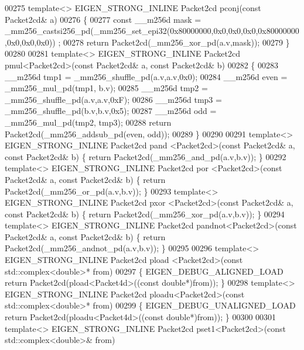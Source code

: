 \begin{DoxyCode}
00275 \textcolor{keyword}{template}<> EIGEN\_STRONG\_INLINE Packet2cd pconj(\textcolor{keyword}{const} Packet2cd& a)
00276 \{
00277   \textcolor{keyword}{const} \_\_m256d mask = \_mm256\_castsi256\_pd(\_mm256\_set\_epi32(0x80000000,0x0,0x0,0x0,0x80000000,0x0,0x0,0x0))
      ;
00278   \textcolor{keywordflow}{return} Packet2cd(\_mm256\_xor\_pd(a.v,mask));
00279 \}
00280 
00281 \textcolor{keyword}{template}<> EIGEN\_STRONG\_INLINE Packet2cd pmul<Packet2cd>(\textcolor{keyword}{const} Packet2cd& a, \textcolor{keyword}{const} Packet2cd& b)
00282 \{
00283   \_\_m256d tmp1 = \_mm256\_shuffle\_pd(a.v,a.v,0x0);
00284   \_\_m256d even = \_mm256\_mul\_pd(tmp1, b.v);
00285   \_\_m256d tmp2 = \_mm256\_shuffle\_pd(a.v,a.v,0xF);
00286   \_\_m256d tmp3 = \_mm256\_shuffle\_pd(b.v,b.v,0x5);
00287   \_\_m256d odd  = \_mm256\_mul\_pd(tmp2, tmp3);
00288   \textcolor{keywordflow}{return} Packet2cd(\_mm256\_addsub\_pd(even, odd));
00289 \}
00290 
00291 \textcolor{keyword}{template}<> EIGEN\_STRONG\_INLINE Packet2cd pand   <Packet2cd>(\textcolor{keyword}{const} Packet2cd& a, \textcolor{keyword}{const} Packet2cd& b) \{ \textcolor{keywordflow}{
      return} Packet2cd(\_mm256\_and\_pd(a.v,b.v)); \}
00292 \textcolor{keyword}{template}<> EIGEN\_STRONG\_INLINE Packet2cd por    <Packet2cd>(\textcolor{keyword}{const} Packet2cd& a, \textcolor{keyword}{const} Packet2cd& b) \{ \textcolor{keywordflow}{
      return} Packet2cd(\_mm256\_or\_pd(a.v,b.v)); \}
00293 \textcolor{keyword}{template}<> EIGEN\_STRONG\_INLINE Packet2cd pxor   <Packet2cd>(\textcolor{keyword}{const} Packet2cd& a, \textcolor{keyword}{const} Packet2cd& b) \{ \textcolor{keywordflow}{
      return} Packet2cd(\_mm256\_xor\_pd(a.v,b.v)); \}
00294 \textcolor{keyword}{template}<> EIGEN\_STRONG\_INLINE Packet2cd pandnot<Packet2cd>(\textcolor{keyword}{const} Packet2cd& a, \textcolor{keyword}{const} Packet2cd& b) \{ \textcolor{keywordflow}{
      return} Packet2cd(\_mm256\_andnot\_pd(a.v,b.v)); \}
00295 
00296 \textcolor{keyword}{template}<> EIGEN\_STRONG\_INLINE Packet2cd pload <Packet2cd>(\textcolor{keyword}{const} std::complex<double>* from)
00297 \{ EIGEN\_DEBUG\_ALIGNED\_LOAD \textcolor{keywordflow}{return} Packet2cd(pload<Packet4d>((\textcolor{keyword}{const} \textcolor{keywordtype}{double}*)from)); \}
00298 \textcolor{keyword}{template}<> EIGEN\_STRONG\_INLINE Packet2cd ploadu<Packet2cd>(\textcolor{keyword}{const} std::complex<double>* from)
00299 \{ EIGEN\_DEBUG\_UNALIGNED\_LOAD \textcolor{keywordflow}{return} Packet2cd(ploadu<Packet4d>((\textcolor{keyword}{const} \textcolor{keywordtype}{double}*)from)); \}
00300 
00301 \textcolor{keyword}{template}<> EIGEN\_STRONG\_INLINE Packet2cd pset1<Packet2cd>(\textcolor{keyword}{const} std::complex<double>& from)

\end{DoxyCode}
